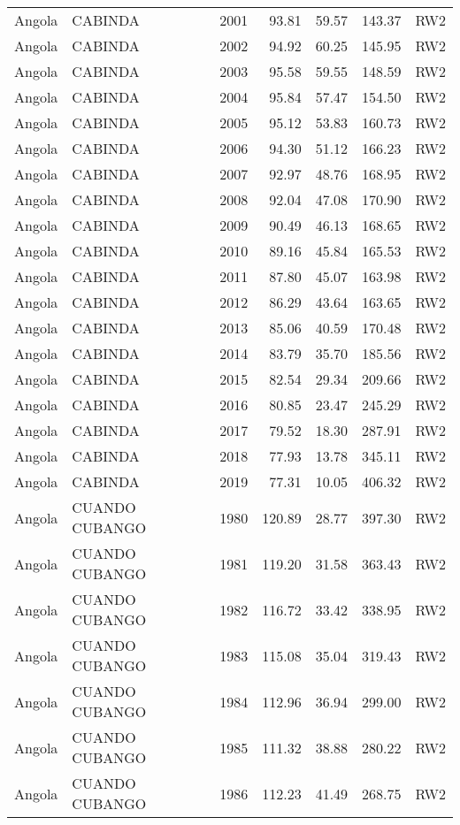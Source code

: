 \begin{longtable}{lllrrrl}
  Angola & CABINDA & 2001 & 93.81 & 59.57 & 143.37 & RW2 \\ 
  Angola & CABINDA & 2002 & 94.92 & 60.25 & 145.95 & RW2 \\ 
  Angola & CABINDA & 2003 & 95.58 & 59.55 & 148.59 & RW2 \\ 
  Angola & CABINDA & 2004 & 95.84 & 57.47 & 154.50 & RW2 \\ 
  Angola & CABINDA & 2005 & 95.12 & 53.83 & 160.73 & RW2 \\ 
  Angola & CABINDA & 2006 & 94.30 & 51.12 & 166.23 & RW2 \\ 
  Angola & CABINDA & 2007 & 92.97 & 48.76 & 168.95 & RW2 \\ 
  Angola & CABINDA & 2008 & 92.04 & 47.08 & 170.90 & RW2 \\ 
  Angola & CABINDA & 2009 & 90.49 & 46.13 & 168.65 & RW2 \\ 
  Angola & CABINDA & 2010 & 89.16 & 45.84 & 165.53 & RW2 \\ 
  Angola & CABINDA & 2011 & 87.80 & 45.07 & 163.98 & RW2 \\ 
  Angola & CABINDA & 2012 & 86.29 & 43.64 & 163.65 & RW2 \\ 
  Angola & CABINDA & 2013 & 85.06 & 40.59 & 170.48 & RW2 \\ 
  Angola & CABINDA & 2014 & 83.79 & 35.70 & 185.56 & RW2 \\ 
  Angola & CABINDA & 2015 & 82.54 & 29.34 & 209.66 & RW2 \\ 
  Angola & CABINDA & 2016 & 80.85 & 23.47 & 245.29 & RW2 \\ 
  Angola & CABINDA & 2017 & 79.52 & 18.30 & 287.91 & RW2 \\ 
  Angola & CABINDA & 2018 & 77.93 & 13.78 & 345.11 & RW2 \\ 
  Angola & CABINDA & 2019 & 77.31 & 10.05 & 406.32 & RW2 \\ 
  Angola & CUANDO CUBANGO & 1980 & 120.89 & 28.77 & 397.30 & RW2 \\ 
  Angola & CUANDO CUBANGO & 1981 & 119.20 & 31.58 & 363.43 & RW2 \\ 
  Angola & CUANDO CUBANGO & 1982 & 116.72 & 33.42 & 338.95 & RW2 \\ 
  Angola & CUANDO CUBANGO & 1983 & 115.08 & 35.04 & 319.43 & RW2 \\ 
  Angola & CUANDO CUBANGO & 1984 & 112.96 & 36.94 & 299.00 & RW2 \\ 
  Angola & CUANDO CUBANGO & 1985 & 111.32 & 38.88 & 280.22 & RW2 \\ 
  Angola & CUANDO CUBANGO & 1986 & 112.23 & 41.49 & 268.75 & RW2 \\ 

\end{longtable}
